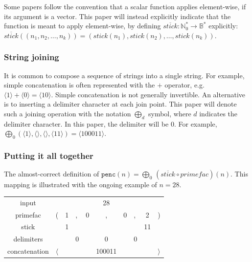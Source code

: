 \documentclass[12pt,reqno]{article}
\begin{document}
Some papers follow the convention that a scalar function applies element-wise, if its argument is a vector. This paper will instead explicitly indicate that the function is meant to apply element-wise, by defining $\overline{stick} : \mathbb{N}_0^{*} \rightarrow \mathbb{B}^{*}$ explicitly: $\overline{stick}((n_1, n_2, \ldots, n_k)) = (stick(n_1), stick(n_2), \ldots, stick(n_k))$.

\subsubsection{String joining}

It is common to compose a sequence of strings into a single string. For example, simple concatenation is often represented with the $+$ operator, e.g. $\langle 1 \rangle + \langle 0 \rangle = \langle 10 \rangle$. Simple concatenation is not generally invertible. An alternative is to inserting a delimiter character at each join point. This paper will denote such a joining operation with the notation $\bigoplus_d$ symbol, where $d$ indicates the delimiter character. In this paper, the delimiter will be $0$. 
For example, $\bigoplus_0 (\langle 1 \rangle, \langle \rangle, \langle \rangle, \langle 11 \rangle) = \langle 100011 \rangle$. 

\subsubsection{Putting it all together}

The almost-correct definition of $\texttt{penc}(n) = \bigoplus_0 \, (\overline{stick} \circ primefac)(n)$. This mapping is illustrated with the ongoing example of $n = 28$.
\begin{center} \begin{tabular}{ |c| l cl cc cl c r| } 
  \hline
    input                &                &    &    &     &   28     &     &    &      &  \\
    primefac          &       (        & 1 & ,  & 0 & ,           & 0  & ,  &  2  & ) \\
  \hline
    stick                &                 & 1 &    &    &             &     &    & 11  & \\ 
    delimiters        &                 &    & 0 &    &    0       &     & 0 &      & \\
  \hline
    concatenation & $\langle$ &    &     &   & 100011 &    &     &      & $\rangle$ \\
  \hline
\end{tabular} \end{center}
\end{document}
